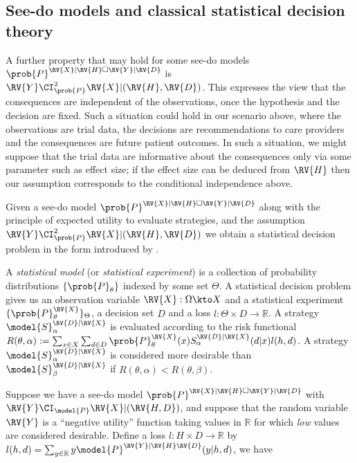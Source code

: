 \subsection{See-do models and classical statistical decision theory}

A further property that may hold for some see-do models $\prob{P}^{\RV{X}|\RV{H}\square \RV{Y}|\RV{D}}$ is $\RV{Y}\CI^2_{\prob{P}} \RV{X}|(\RV{H},\RV{D})$. This expresses the view that the consequences are independent of the observations, once the hypothesis and the decision are fixed. Such a situation could hold in our scenario above, where the observations are trial data, the decisions are recommendations to care providers and the consequences are future patient outcomes. In such a situation, we might suppose that the trial data are informative about the consequences only via some parameter such as effect size; if the effect size can be deduced from $\RV{H}$ then our assumption corresponds to the conditional independence above.

Given a see-do model $\prob{P}^{\RV{X}|\RV{H}\square \RV{Y}|\RV{D}}$ along with the principle of expected utility to evaluate strategies, and the assumption $\RV{Y}\CI^2_{\prob{P}} \RV{X}|(\RV{H},\RV{D})$ we obtain a statistical decision problem in the form introduced by \citet{wald_statistical_1950}.

A \emph{statistical model} (or \emph{statistical experiment}) is a collection of probability distributions $\{\prob{P}_\theta\}$ indexed by some set $\Theta$. A statistical decision problem gives us an observation variable $\RV{X}:\Omega\kto X$ and a statistical experiment $\{\prob{P}^{\RV{X}}_\theta\}_\Theta$, a decision set $D$ and a loss $l:\Theta\times D\to \mathbb{R}$. A strategy $\model{S}^{\RV{D}|\RV{X}}_\alpha$ is evaluated according to the risk functional $R(\theta,\alpha):=\sum_{x\in X}\sum_{d\in D} \prob{P}^{\RV{X}}_\theta(x) S^{\RV{D}|\RV{X}}_\alpha (d|x) l(h,d)$. A strategy $\model{S}^{\RV{D}|\RV{X}}_\alpha$ is considered more desirable than $\model{S}^{\RV{D}|\RV{X}}_\beta$ if $R(\theta,\alpha)<R(\theta,\beta)$.

Suppose we have a see-do model $\prob{P}^{\RV{X}|\RV{H}\square \RV{Y}|\RV{D}}$ with $\RV{Y}\CI_{\model{P}} \RV{X}|(\RV{H,D})$, and suppose that the random variable $\RV{Y}$ is a ``negative utility'' function taking values in $\mathbb{R}$ for which \emph{low} values are considered desirable. Define a loss $l:H\times D\to \mathbb{R}$ by $l(h,d) = \sum_{y\in \mathbb{R}} y\model{P}^{\RV{Y}|\RV{H}\RV{D}}(y|h,d)$, we have 

